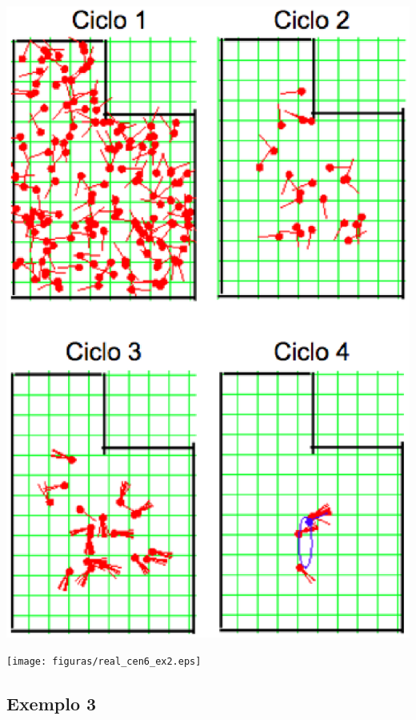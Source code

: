 {\centering
\includegraphics[scale=0.4]{figuras/cen6_ex2.eps}
\label{img:cen6_ex2}
\par}

{\centering
\texttt{[image: figuras/real\_cen6\_ex2.eps]}
\label{img:real_cen6_ex2}
\par}

\subsection{Exemplo 3}

